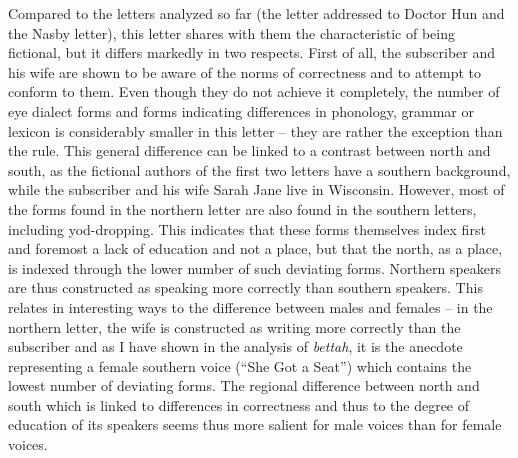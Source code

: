 Compared to the letters analyzed so far (the letter addressed to Doctor Hun and the Nasby letter), this letter shares with them the characteristic of being fictional, but it differs markedly in two respects. First of all, the subscriber and his wife are shown to be aware of the norms of correctness and to attempt to conform to them. Even though they do not achieve it completely, the number of eye dialect forms and forms indicating differences in phonology, grammar or lexicon is considerably smaller in this letter – they are rather the exception than the rule. This general difference can be linked to a contrast between north and south, as the fictional authors of the first two letters have a southern background, while the subscriber and his wife Sarah Jane live in Wisconsin. However, most of the forms found in the northern letter are also found in the southern letters, including yod-dropping. This indicates that these forms themselves index first and foremost a lack of education and not a place, but that the north, as a place, is indexed through the lower number of such deviating forms. Northern speakers are thus constructed as speaking more correctly than southern speakers. This relates in interesting ways to the difference between males and females – in the northern letter, the wife is constructed as writing more correctly than the subscriber and as I have shown in the analysis of \emph{bettah}, it is the anecdote representing a female southern voice (“She Got a Seat”) which contains the lowest number of deviating forms. The regional difference between north and south which is linked to differences in correctness and thus to the degree of education of its speakers seems thus more salient for male voices than for female voices.

